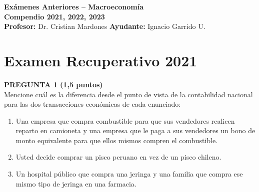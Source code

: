 \documentclass[11pt,addpoints]{article}
\begin{document}
\vspace*{0.1cm}

\begin{center}
{\Large \bfseries Exámenes Anteriores – Macroeconomía \\[0.25cm]}
\textbf{Compendio 2021, 2022, 2023}\\[0.3cm]
\textbf{Profesor:} Dr. Cristian Mardones \textbf{Ayudante:} Ignacio Garrido U.
\end{center}


\section*{Examen Recuperativo 2021}

\textbf{PREGUNTA 1 (1,5 puntos)}\\[0.2cm]
Mencione cuál es la diferencia desde el punto de vista de la contabilidad nacional para las dos transacciones económicas de cada enunciado:

\begin{enumerate}[label=\alph*)]
\item Una empresa que compra combustible para que sus vendedores realicen reparto en camioneta y una empresa que le paga a sus vendedores un bono de monto equivalente para que ellos mismos compren el combustible.
\item Usted decide comprar un pisco peruano en vez de un pisco chileno.
\item Un hospital público que compra una jeringa y una familia que compra ese mismo tipo de jeringa en una farmacia.
\end{enumerate}
\end{document}
